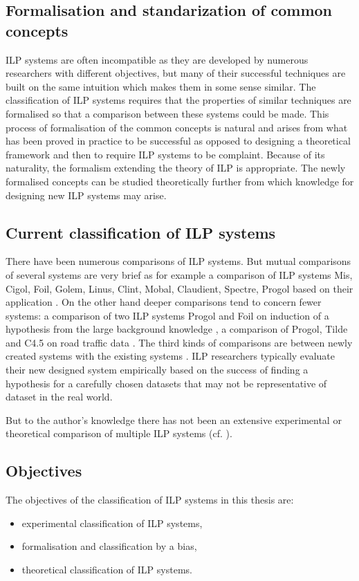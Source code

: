 \subsection{Formalisation and standarization of common concepts}
ILP systems are often incompatible as they are developed by numerous researchers with different objectives, but many of their successful techniques are built on the same intuition which makes them in some sense similar. The classification of ILP systems requires that the properties of similar techniques are formalised so that a comparison between these systems could be made. This process of formalisation of the common concepts is natural and arises from what has been proved in practice to be successful as opposed to designing a theoretical framework and then to require ILP systems to be complaint. Because of its naturality, the formalism extending the theory of ILP is appropriate. The newly formalised concepts can be studied theoretically further from which knowledge for designing new ILP systems may arise.

\subsection{Current classification of ILP systems}
There have been numerous comparisons of ILP systems. But mutual comparisons of several systems are very brief as for example a comparison of ILP systems Mis, Cigol, Foil, Golem, Linus, Clint, Mobal, Claudient, Spectre, Progol based on their application \cite{nienhuys1997foundations}.
On the other hand deeper comparisons tend to concern fewer systems: 
a comparison of two ILP systems Progol and Foil on induction of a hypothesis from the large background knowledge \cite{srinivasan1995comparing},
a comparison of Progol, Tilde and C4.5 on road traffic data \cite{roberts1998comparison}. The third kinds of comparisons are between newly created systems with the existing systems \cite{muggleton2012mc} \cite{corapi2011nonmonotonic}.
ILP researchers typically evaluate their new designed system empirically based on the success of finding a hypothesis for a carefully chosen datasets that may not be representative of dataset in the real world.

But to the author's knowledge there has not been an extensive experimental or theoretical comparison of multiple ILP systems (cf. ). 

\subsection{Objectives}
The objectives of the classification of ILP systems in this thesis are:
\begin{itemize}
\item experimental classification of ILP systems,
\item formalisation and classification by a bias,
\item theoretical classification of ILP systems.
\end{itemize}

